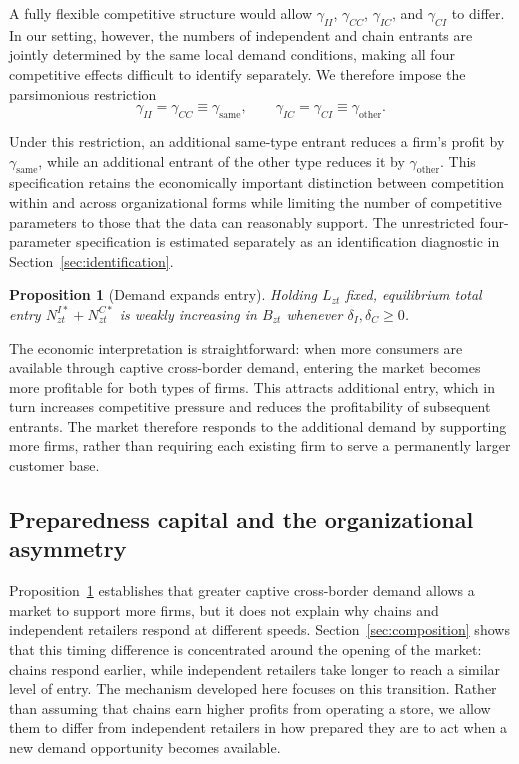\documentclass[english,12pt]{article}
\newtheorem{proposition}{Proposition}
\begin{document}
A fully flexible competitive structure would allow $\gamma_{II}$, $\gamma_{CC}$, $\gamma_{IC}$, and $\gamma_{CI}$ to differ. In our setting, however, the numbers of independent and chain entrants are jointly determined by the same local demand conditions, making all four competitive effects difficult to identify separately. We therefore impose the parsimonious restriction
\begin{equation}
\label{eq:competition_restriction}
\gamma_{II}
=
\gamma_{CC}
\equiv
\gamma_{\mathrm{same}},
\qquad
\gamma_{IC}
=
\gamma_{CI}
\equiv
\gamma_{\mathrm{other}}.
\end{equation}

Under this restriction, an additional same-type entrant reduces a firm's profit by $\gamma_{\mathrm{same}}$, while an additional entrant of the other type reduces it by $\gamma_{\mathrm{other}}$. This specification retains the economically important distinction between competition within and across organizational forms while limiting the number of competitive parameters to those that the data can reasonably support. The unrestricted four-parameter specification is estimated separately as an identification diagnostic in Section~\ref{sec:identification}.

\begin{proposition}[Demand expands entry]
\label{prop:demandentry}
Holding $L_{zt}$ fixed, equilibrium total entry
$N^{I*}_{zt}+N^{C*}_{zt}$
is weakly increasing in $B_{zt}$ whenever
$\delta_I,\delta_C\geq0$.
\end{proposition}
The economic interpretation is straightforward: when more consumers are available through captive cross-border demand, entering the market becomes more profitable for both types of firms. This attracts additional entry, which in turn increases competitive pressure and reduces the profitability of subsequent entrants. The market therefore responds to the additional demand by supporting more firms, rather than requiring each existing firm to serve a permanently larger customer base.

\subsection{Preparedness capital and the organizational asymmetry}
\label{sec:preparedness}
Proposition~\ref{prop:demandentry} establishes that greater captive cross-border demand allows a market to support more firms, but it does not explain why chains and independent retailers respond at different speeds. Section~\ref{sec:composition} shows that this timing difference is concentrated around the opening of the market: chains respond earlier, while independent retailers take longer to reach a similar level of entry. The mechanism developed here focuses on this transition. Rather than assuming that chains earn higher profits from operating a store, we allow them to differ from independent retailers in how prepared they are to act when a new demand opportunity becomes available.
\end{document}
